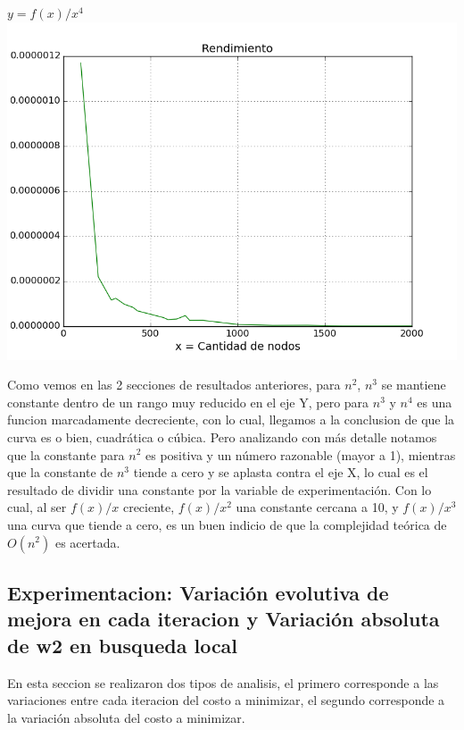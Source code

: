 \begin{center}
	\textbf{$y = f(x)/x^4$}\\
	\includegraphics[scale=0.7]{experimentos/bqlocal/rendimiento_aristas_cuadraticas_3/complexity_med_over_n_fourth.png}
\end{center}

Como vemos en las 2 secciones de resultados anteriores, para $n^2$, $n^3$ se mantiene constante dentro de un rango muy reducido en el eje Y, pero para $n^3$ y $n^4$ es una funcion marcadamente decreciente, con lo cual, llegamos a la conclusion de que la curva es o bien,  cuadr\'atica o c\'ubica. Pero analizando con m\'as detalle notamos que la constante para $n^2$ es positiva y un n\'umero razonable (mayor a 1), mientras que la constante de $n^3$ tiende a cero y se aplasta contra el eje X, lo cual es el resultado de dividir una constante por la variable de experimentaci\'on. Con lo cual, al ser $f(x)/x$ creciente,  $f(x)/x^2$ una constante cercana a 10, y $f(x)/x^3$ una curva que tiende a cero, es un buen indicio de que la complejidad te\'orica de $O(n^2)$ es acertada.

\subsection{Experimentacion: Variaci\'on evolutiva de mejora en cada iteracion y Variaci\'on absoluta de w2 en busqueda local}
En esta seccion se realizaron dos tipos de analisis, el primero corresponde a las variaciones entre cada iteracion del costo a minimizar, el segundo corresponde a la variaci\'on absoluta del costo a minimizar.\\

